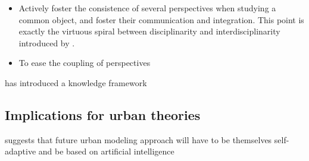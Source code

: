 \begin{itemize}
	\item Actively foster the consistence of several perspectives when studying a common object, and foster their communication and integration. This point is exactly the virtuous spiral between disciplinarity and interdisciplinarity introduced by \cite{banos2013pour}.
	\item To ease the coupling of perspectives
\end{itemize}





\cite{raimbault2017applied} has introduced a knowledge framework




\subsection{Implications for urban theories}



\cite{white2017necessity} suggests that future urban modeling approach will have to be themselves self-adaptive and be based on artificial intelligence


